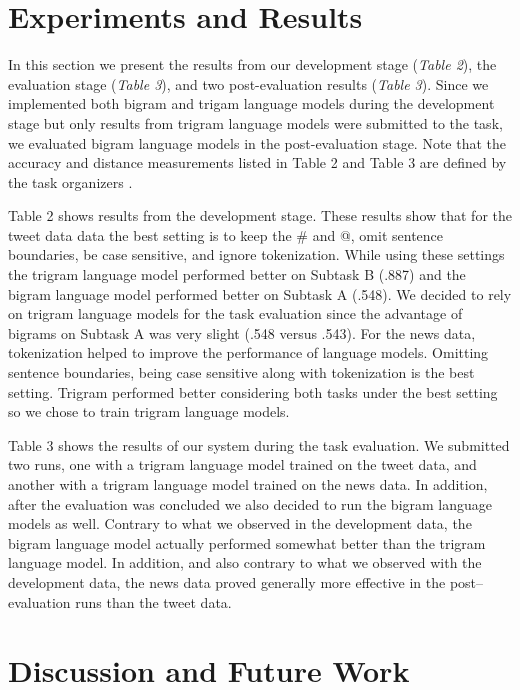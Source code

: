 \documentclass[11pt,a4paper]{article}
\begin{document}
\section{Experiments and Results}

In this section we present the results from our development stage (\textit{Table 2}), 
the evaluation stage (\textit{Table 3}), and two post-evaluation results 
(\textit{Table 3}). Since we implemented both bigram and trigam language models during the 
development stage but only results from trigram language models were submitted to the task, 
we evaluated bigram language models in the post-evaluation stage. Note that the accuracy and 
distance measurements listed in Table 2 and Table 3 are defined by the task organizers 
\cite{PotashRR17}. 

Table 2 shows results from the development stage. These results show 
that for the tweet data data the best setting is to keep 
the \# and @, omit sentence boundaries, be case sensitive, and ignore 
tokenization. While using these settings the trigram language model
performed better on Subtask B (.887) and the bigram 
language model performed better on Subtask A (.548). We decided to rely
on trigram language models for the task evaluation since the advantage
of bigrams on Subtask A was very slight (.548 versus .543). 
For the news data, tokenization helped to improve the performance of 
language models. Omitting sentence boundaries, being case sensitive along with tokenization is the best setting. 
Trigram performed better considering both 
tasks under the best setting so we chose to train trigram language  models.

Table 3 shows the results of our system during the task evaluation. We submitted
two runs, one with a trigram language model trained on the tweet data, and another
with a trigram language model trained on the news data. In addition, after
the evaluation was concluded we also decided to run the bigram language models as well.
Contrary to what we observed in the development data, the bigram language 
model actually performed somewhat better than the trigram
language model. In addition, and also contrary to what we observed with the
development data, the news data proved generally more effective in the
post--evaluation runs than the tweet data. 

\section{Discussion and Future Work}
\end{document}
